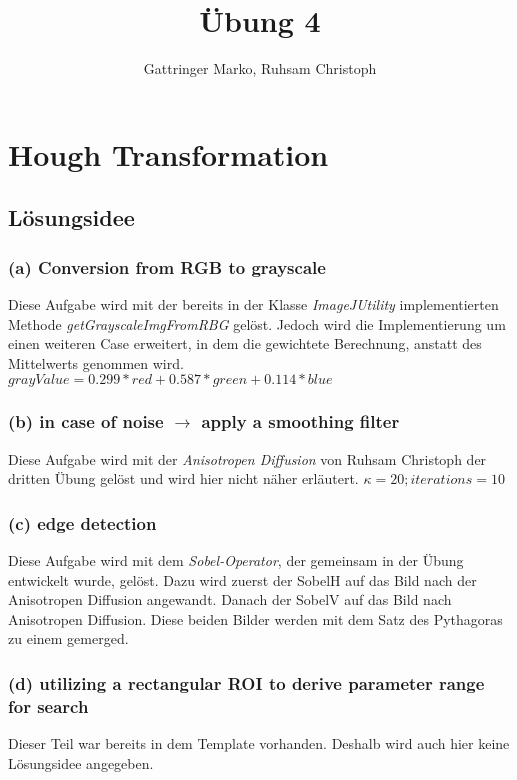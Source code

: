 \documentclass[11pt, a4paper, twoside]{article}   	%
\title{Übung 4}
\author{Gattringer Marko, Ruhsam Christoph}
\begin{document}
\setlength{\headheight}{15mm}


\section{Hough Transformation}
\subsection{Lösungsidee}
\subsubsection{(a) Conversion from RGB to grayscale}
Diese Aufgabe wird mit der bereits in der Klasse \textit{ImageJUtility} implementierten Methode \textit{getGrayscaleImgFromRBG} gelöst. Jedoch wird die Implementierung um einen weiteren Case erweitert, in dem die gewichtete Berechnung, anstatt des Mittelwerts genommen wird. \newline \newline
\mbox{\LARGE $ grayValue = 0.299 * red + 0.587 * green + 0.114 * blue$}

\subsubsection{(b) in case of noise $\rightarrow$ apply a smoothing filter}
Diese Aufgabe wird mit der \textit{Anisotropen Diffusion} von Ruhsam Christoph der dritten Übung gelöst und wird hier nicht näher erläutert.
$\kappa = 20; iterations = 10$

\subsubsection{(c) edge detection}
Diese Aufgabe wird mit dem \textit{Sobel-Operator}, der gemeinsam in der Übung entwickelt wurde, gelöst. Dazu wird zuerst der SobelH auf das Bild nach der Anisotropen Diffusion angewandt. Danach der SobelV auf das Bild nach Anisotropen Diffusion. Diese beiden Bilder werden mit dem Satz des Pythagoras zu einem gemerged.

\subsubsection{(d) utilizing a rectangular ROI to derive parameter range for search}
Dieser Teil war bereits in dem Template vorhanden. Deshalb wird auch hier keine Lösungsidee angegeben.
\end{document}
